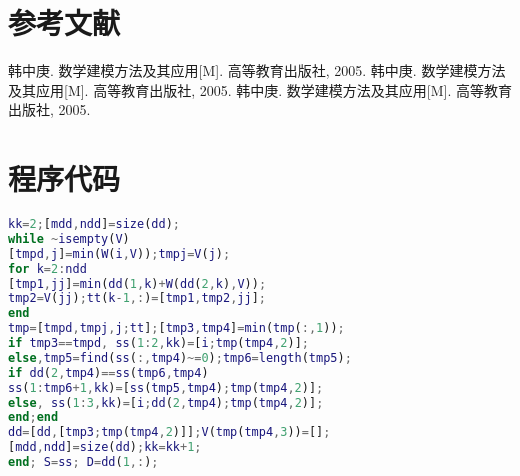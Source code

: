 \documentclass[bwprint]{gmcmthesis}
\begin{document}
%

\section{参考文献}
\begin{thebibliography}{1.2}%
\setlength{\itemsep}{-2mm}
 韩中庚. 数学建模方法及其应用[M]. 高等教育出版社, 2005.
 韩中庚. 数学建模方法及其应用[M]. 高等教育出版社, 2005.
 韩中庚. 数学建模方法及其应用[M]. 高等教育出版社, 2005.
\end{thebibliography}

\newpage
\appendix
\section{程序代码}
\begin{lstlisting}[language=Matlab] 
kk=2;[mdd,ndd]=size(dd);
while ~isempty(V)
[tmpd,j]=min(W(i,V));tmpj=V(j);
for k=2:ndd
[tmp1,jj]=min(dd(1,k)+W(dd(2,k),V));
tmp2=V(jj);tt(k-1,:)=[tmp1,tmp2,jj];
end
tmp=[tmpd,tmpj,j;tt];[tmp3,tmp4]=min(tmp(:,1));
if tmp3==tmpd, ss(1:2,kk)=[i;tmp(tmp4,2)];
else,tmp5=find(ss(:,tmp4)~=0);tmp6=length(tmp5);
if dd(2,tmp4)==ss(tmp6,tmp4)
ss(1:tmp6+1,kk)=[ss(tmp5,tmp4);tmp(tmp4,2)];
else, ss(1:3,kk)=[i;dd(2,tmp4);tmp(tmp4,2)];
end;end
dd=[dd,[tmp3;tmp(tmp4,2)]];V(tmp(tmp4,3))=[];
[mdd,ndd]=size(dd);kk=kk+1;
end; S=ss; D=dd(1,:);
 \end{lstlisting}
\end{document}
